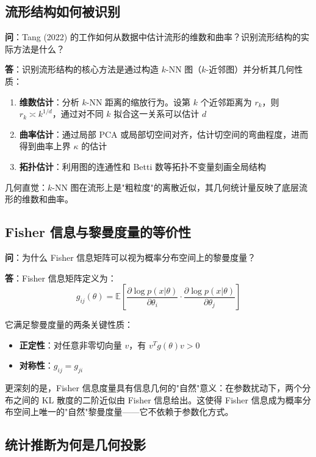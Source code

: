 \subsection{流形结构如何被识别}\label{sec:qa-manifold-structure-identification}

\textbf{问}：Tang (2022) 的工作如何从数据中估计流形的维数和曲率？识别流形结构的实际方法是什么？

\textbf{答}：识别流形结构的核心方法是通过构造 $k$-NN 图（$k$-近邻图）并分析其几何性质：

\begin{enumerate}
    \item \textbf{维数估计}：分析 $k$-NN 距离的缩放行为。设第 $k$ 个近邻距离为 $r_k$，则 $r_k \asymp k^{1/d}$，通过对不同 $k$ 拟合这一关系可以估计 $d$
    \item \textbf{曲率估计}：通过局部 PCA 或局部切空间对齐，估计切空间的弯曲程度，进而得到曲率上界 $\kappa$ 的估计
    \item \textbf{拓扑估计}：利用图的连通性和 Betti 数等拓扑不变量刻画全局结构
\end{enumerate}

几何直觉：$k$-NN 图在流形上是"粗粒度"的离散近似，其几何统计量反映了底层流形的维数和曲率。

\subsection{Fisher 信息与黎曼度量的等价性}\label{sec:qa-fisher-riemann-metric}

\textbf{问}：为什么 Fisher 信息矩阵可以视为概率分布空间上的黎曼度量？

\textbf{答}：Fisher 信息矩阵定义为：
$$g_{ij}(\theta) = \mathbb{E}\left[\frac{\partial \log p(x|\theta)}{\partial \theta_i} \cdot \frac{\partial \log p(x|\theta)}{\partial \theta_j}\right]$$

它满足黎曼度量的两条关键性质：

\begin{itemize}
    \item \textbf{正定性}：对任意非零切向量 $v$，有 $v^T g(\theta) v > 0$
    \item \textbf{对称性}：$g_{ij} = g_{ji}$
\end{itemize}

更深刻的是，Fisher 信息度量具有信息几何的"自然"意义：在参数扰动下，两个分布之间的 KL 散度的二阶近似由 Fisher 信息给出。这使得 Fisher 信息成为概率分布空间上唯一的"自然"黎曼度量——它不依赖于参数化方式。

\subsection{统计推断为何是几何投影}\label{sec:qa-statistical-inference-projection}

